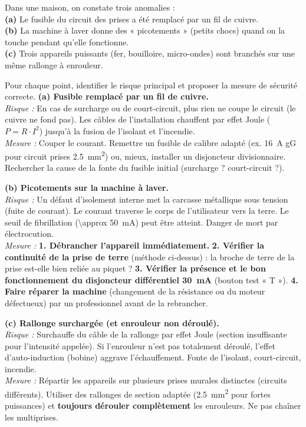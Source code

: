 \documentclass[11pt]{article}
\begin{document}
\begin{exoresolu}
Dans une maison, on constate trois anomalies :\\
\textbf{(a)} Le fusible du circuit des prises a été remplacé par un fil de cuivre.\\
\textbf{(b)} La machine à laver donne des « picotements » (petits chocs) quand on la touche pendant qu'elle fonctionne.\\
\textbf{(c)} Trois appareils puissants (fer, bouilloire, micro-ondes) sont branchés sur une même rallonge à enrouleur.

Pour chaque point, identifier le risque principal et proposer la mesure de sécurité correcte.
\tcblower
\textbf{(a) Fusible remplacé par un fil de cuivre.}\\
\textit{Risque :} En cas de surcharge ou de court-circuit, plus rien ne coupe le circuit (le cuivre ne fond pas). Les câbles de l'installation chauffent par effet Joule ($P = R \cdot I^{2}$) jusqu'à la fusion de l'isolant et l'incendie.\\
\textit{Mesure :} Couper le courant. Remettre un fusible de calibre adapté (ex. \SI{16}{A} gG pour circuit prises \SI{2,5}{mm^{2}}) ou, mieux, installer un disjoncteur divisionnaire. Rechercher la cause de la fonte du fusible initial (surcharge ? court-circuit ?).

\textbf{(b) Picotements sur la machine à laver.}\\
\textit{Risque :} Un défaut d'isolement interne met la carcasse métallique sous tension (fuite de courant). Le courant traverse le corps de l'utilisateur vers la terre. Le seuil de fibrillation (\SI{\approx 50}{mA}) peut être atteint. Danger de mort par électrocution.\\
\textit{Mesure :} \textbf{1. Débrancher l'appareil immédiatement.} \textbf{2. Vérifier la continuité de la prise de terre} (méthode ci-dessus) : la broche de terre de la prise est-elle bien reliée au piquet ? \textbf{3. Vérifier la présence et le bon fonctionnement du disjoncteur différentiel \SI{30}{mA}} (bouton test « T »). \textbf{4. Faire réparer la machine} (changement de la résistance ou du moteur défectueux) par un professionnel avant de la rebrancher.

\textbf{(c) Rallonge surchargée (et enrouleur non déroulé).}\\
\textit{Risque :} Surchauffe du câble de la rallonge par effet Joule (section insuffisante pour l'intensité appelée). Si l'enrouleur n'est pas totalement déroulé, l'effet d'auto-induction (bobine) aggrave l'échauffement. Fonte de l'isolant, court-circuit, incendie.\\
\textit{Mesure :} Répartir les appareils sur plusieurs prises murales distinctes (circuits différents). Utiliser des rallonges de section adaptée (\SI{2,5}{mm^{2}} pour fortes puissances) et \textbf{toujours dérouler complètement} les enrouleurs. Ne pas chaîner les multiprises.
\end{exoresolu}
\end{document}
